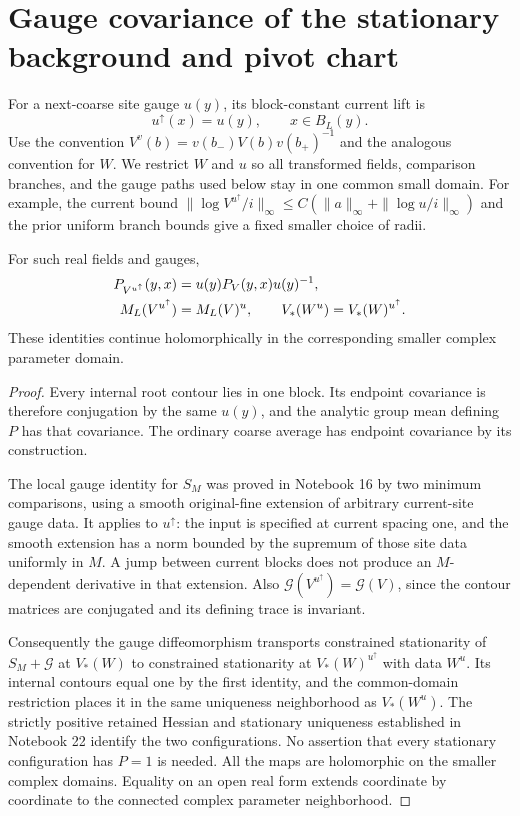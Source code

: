 \section{Gauge covariance of the stationary background and pivot chart}
\label{gc-covariance}

For a next-coarse site gauge $u(y)$, its block-constant current lift is
\begin{equation}\label{gc-block-lift}
 u^\uparrow(x)=u(y),\qquad x\in B_L(y).
\end{equation}
Use the convention
$V^v(b)=v(b_-)V(b)v(b_+)^{-1}$ and the analogous convention for $W$.
We restrict $W$ and $u$ so all transformed fields, comparison branches,
and the gauge paths used below stay in one common small domain.
For example, the current bound
$\|\log V^{u^\uparrow}/i\|_\infty\le
C(\|a\|_\infty+\|\log u/i\|_\infty)$ and the prior uniform
branch bounds give a fixed smaller choice of radii.

\begin{lemma}\label{gc-branch-lemma}
For such real fields and gauges,
\begin{align}
 P_{V^{u^\uparrow}}(y,x)&=u(y)P_V(y,x)u(y)^{-1},\notag\\
 M_L(V^{u^\uparrow})&=M_L(V)^u,\qquad
 V_*(W^u)=V_*(W)^{u^\uparrow}.                           \label{gc-branch-equivariance}
\end{align}
These identities continue holomorphically in the corresponding
smaller complex parameter domain.
\end{lemma}
\begin{proof}
Every internal root contour lies in one block. Its endpoint
covariance is therefore conjugation by the same $u(y)$, and the
analytic group mean defining $P$ has that covariance. The ordinary
coarse average has endpoint covariance by its construction.

The local gauge identity for $S_M$ was proved in Notebook 16 by two
minimum comparisons, using a smooth original-fine extension of
arbitrary current-site gauge data. It applies to $u^\uparrow$:
the input is specified at current spacing one, and the smooth
extension has a norm bounded by the supremum of those site data
uniformly in $M$. A jump between current blocks does not produce
an $M$-dependent derivative in that extension.
Also $\mathscr G(V^{u^\uparrow})=\mathscr G(V)$, since the
contour matrices are conjugated and its defining trace is invariant.

Consequently the gauge diffeomorphism transports constrained
stationarity of $S_M+\mathscr G$ at $V_*(W)$ to constrained
stationarity at $V_*(W)^{u^\uparrow}$ with data $W^u$.
Its internal contours equal one by the first identity, and the
common-domain restriction places it in the same uniqueness
neighborhood as $V_*(W^u)$. The strictly positive retained Hessian
and stationary uniqueness established in Notebook 22 identify
the two configurations. No assertion that every stationary
configuration has $P=1$ is needed.
All the maps are holomorphic on the smaller complex domains.
Equality on an open real form extends coordinate by coordinate
to the connected complex parameter neighborhood.
\end{proof}

